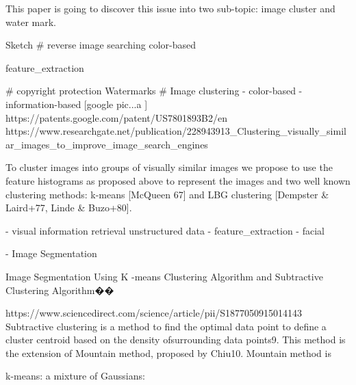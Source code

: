 This paper is going to discover this issue into two sub-topic: image cluster and water mark.

Sketch
# reverse image searching
    color-based

    feature_extraction   

# copyright protection
    Watermarks  
# Image clustering
    - color-based
    - information-based [google pic...a ]
    https://patents.google.com/patent/US7801893B2/en  
    https://www.researchgate.net/publication/228943913_Clustering_visually_similar_images_to_improve_image_search_engines  {

To cluster images into groups of visually similar images we propose to use the feature histograms as proposed above to represent the images and two well known clustering methods: k-means [McQueen 67] and LBG clustering [Dempster & Laird+77, Linde & Buzo+80]. 
    }
        - visual information retrieval
         unstructured data
        - feature_extraction   
        - facial 

        - Image Segmentation  

Image Segmentation Using K -means Clustering Algorithm and Subtractive Clustering Algorithm��{
https://www.sciencedirect.com/science/article/pii/S1877050915014143
Subtractive clustering is a method to find the optimal data point to define a cluster centroid based on the density ofsurrounding data points9. This method is the extension of Mountain method, proposed by Chiu10. Mountain method is

}

k-means: 
a mixture of Gaussians: 

